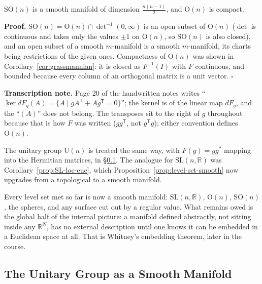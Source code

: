 \documentclass[11pt]{report}
\makeatletter
\newcounter{thmcounter}[section]
\renewenvironment{proof}[1][Proof]{\noindent\textbf{#1.} }{\hfill$\square$\par\vspace{5pt}}
\newcommand{\thmlabel}[1]{\edef\@currentlabel{\arabic{section}.\arabic{thmcounter}}\label{#1}}
\newcommand{\SL}{\mathrm{SL}}
\newcommand{\Ogp}{\mathrm{O}}
\newcommand{\SO}{\mathrm{SO}}
\newcommand{\Ugp}{\mathrm{U}}
\newcommand{\leeref}[1]{\par\smallskip{\raggedleft\footnotesize\textsc{Lee}:\ #1\par}}
\makeatother
\begin{document}
\begin{corbox}[Consequences]\thmlabel{cor:On-consequences}
$\SO(n)$ is a smooth manifold of dimension $\tfrac{n(n-1)}{2}$, and $\Ogp(n)$ is compact.
\leeref{Example 7.27}
\end{corbox}

\begin{proof}
$\SO(n) = \Ogp(n) \cap \det^{-1}(0,\infty)$ is an open subset of $\Ogp(n)$ ($\det$ is continuous and takes only the values $\pm1$ on $\Ogp(n)$, so $\SO(n)$ is also closed), and an open subset of a smooth $m$-manifold is a smooth $m$-manifold, its charts being restrictions of the given ones. Compactness of $\Ogp(n)$ was shown in Corollary~\ref{cor:grassmannian}: it is closed as $F^{-1}(I)$ with $F$ continuous, and bounded because every column of an orthogonal matrix is a unit vector.
\end{proof}

\textbf{Transcription note.} Page 20 of the handwritten notes writes ``$\ker dF_g(A) = \{A \mid gA^{\mathsf T} + Ag^{\mathsf T} = 0\}$''; the kernel is of the linear map $dF_g$, and the ``$(A)$'' does not belong. The transposes sit to the right of $g$ throughout because that is how $F$ was written ($gg^{\mathsf T}$, not $g^{\mathsf T}g$); either convention defines $\Ogp(n)$.

The unitary group $\Ugp(n)$ is treated the same way, with $F(g) = gg^*$ mapping into the Hermitian matrices, in \S\ref{sub:un-smooth}. The analogue for $\SL(n,\mathbb{R})$ was Corollary~\ref{prop:SL-loc-euc}, which Proposition~\ref{prop:level-set-smooth} now upgrades from a topological to a smooth manifold.

\begin{rembox}\label{rem:where-this-leaves-us}
Every level set met so far is now a smooth manifold: $\SL(n,\mathbb{R})$, $\Ogp(n)$, $\SO(n)$, the spheres, and any surface cut out by a regular value. What remains owed is the global half of the internal picture: a manifold defined abstractly, not sitting inside any $\mathbb{R}^N$, has no external description until one knows it can be embedded in a Euclidean space at all. That is Whitney's embedding theorem, later in the course.
\end{rembox}

\subsection{The Unitary Group as a Smooth Manifold}\label{sub:un-smooth}
\end{document}
